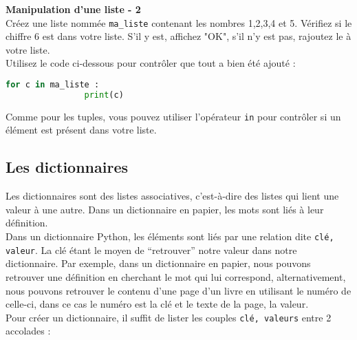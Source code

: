     \begin{Exercice}[5 minutes] \textbf{Manipulation d'une liste - 2}\\
       Créez une liste nommée \lstinline{ma_liste} contenant les nombres 1,2,3,4 et 5. Vérifiez si le chiffre 6 est dans votre liste. S'il y est, affichez "OK", s'il n'y est pas, rajoutez le à votre liste. \\
       
       Utilisez le code ci-dessous pour contrôler que tout a bien été ajouté : \\
       
       \begin{lstlisting}[language=Python]
            for c in ma_liste :
            	print(c)   \end{lstlisting}
    
        \begin{conseil}
            Comme pour les tuples, vous pouvez utiliser l'opérateur \lstinline{in} pour contrôler si un élément est présent dans votre liste.
        \end{conseil}
        
        \begin{solution}
             
        \end{solution}
    \end{Exercice}

	\subsection{Les dictionnaires}
	Les dictionnaires sont des listes associatives, c’est-à-dire des listes qui lient une valeur à une autre. Dans un dictionnaire en papier, les mots sont liés à leur définition. \\
	
	Dans un dictionnaire Python, les éléments sont liés par une relation dite \lstinline{clé, valeur}. La clé étant le moyen de “retrouver” notre valeur dans notre dictionnaire. Par exemple, dans un dictionnaire en papier, nous pouvons retrouver une définition en cherchant le mot qui lui correspond, alternativement, nous pouvons retrouver le contenu d’une page d’un livre en utilisant le numéro de celle-ci, dans ce cas le numéro est la clé et le texte de la page, la valeur. \\
	
	Pour créer un dictionnaire, il suffit de lister les couples \lstinline{clé, valeurs} entre 2 accolades : \\
	
